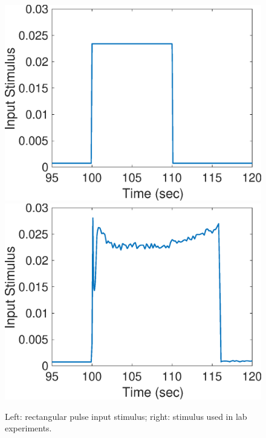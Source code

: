 \begin{figure}[h]
\centering
\includegraphics[width=.4 \textwidth]{Figures/Rectangular_Stimulus.eps}
\includegraphics[width=.4 \textwidth]{Figures/Experimental_Stimulus.eps}
\caption{Left: rectangular pulse input stimulus; right: stimulus used in lab experiments.}
\label{input_stimuli}
\end{figure}
  
